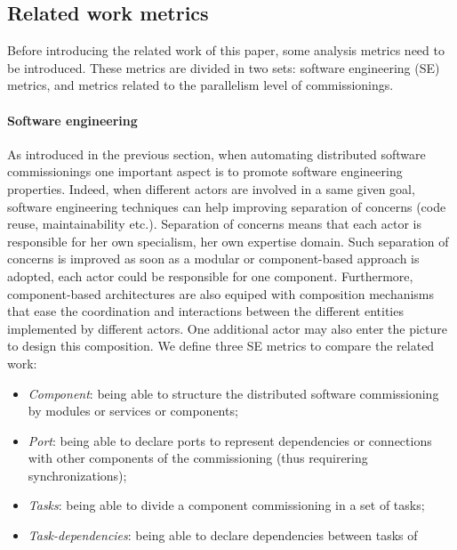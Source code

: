 
\subsection{Related work metrics}

Before introducing the related work of this paper, some analysis
metrics need to be introduced. These metrics are divided in two sets:
software engineering (SE) metrics, and metrics related to the
parallelism level of commissionings.

\paragraph{Software engineering}
As introduced in the previous section, when automating distributed
software commissionings one important aspect is to promote software
engineering properties. Indeed, when different actors are involved in
a same given goal, software engineering techniques can help improving
separation of concerns (\ie code reuse, maintainability
etc.). Separation of concerns means that each actor is responsible for
her own specialism, \ie her own expertise domain. Such separation of
concerns is improved as soon as a modular or component-based approach
is adopted, \ie each actor could be responsible for one
component. Furthermore, component-based architectures are also equiped
with composition mechanisms that ease the coordination and
interactions between the different entities implemented by different
actors. One additional actor may also enter the picture to design this
composition. We define three SE metrics to compare the related work:
\begin{itemize}
\item \emph{Component}: being able to structure the distributed
  software commissioning by modules or services or components;
\item \emph{Port}: being able to declare ports to represent
  dependencies or connections with other components of the
  commissioning (thus requirering synchronizations);
\item \emph{Tasks}: being able to divide a component commissioning in
  a set of tasks;
 \item \emph{Task-dependencies}: being able to declare dependencies
   between tasks of
\end{itemize}

